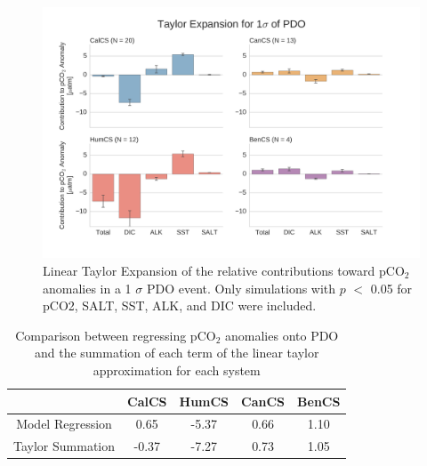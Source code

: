 \documentclass[12pt]{article}
\begin{document}
\clearpage
\begin{figure}[!h]
	\centering
	\includegraphics[width=\linewidth]{../../figs/all-systems/taylor_expansions/taylor-expansion-PDO-pCO2-PVALUEREMOVED-smoothedClimate.png}
	\caption{Linear Taylor Expansion of the relative contributions toward pCO$_{2}$ anomalies in a 1 $\sigma$ PDO event. Only simulations with $p$ $<$ 0.05 for pCO2, SALT, SST, ALK, and DIC were included.}
	\label{fig:taylor-pdo}
\end{figure}
\begin{table}[!h]
	\centering
	\begin{tabular}{c | c c c c }
		& CalCS & HumCS & CanCS & BenCS \\
		\midrule
		Model Regression & 0.65 & -5.37 & 0.66 & 1.10 \\
		Taylor Summation & -0.37 & -7.27 & 0.73 & 1.05 \\
	\end{tabular}
	\caption{Comparison between regressing pCO$_{2}$ anomalies onto PDO and the summation of each term of the linear taylor approximation for each system}
	\label{tab:taylor-pdo}
\end{table}
\end{document}
